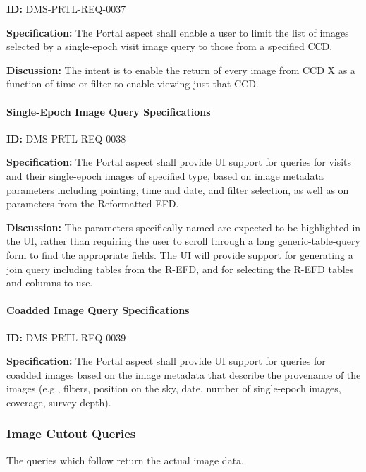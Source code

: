 \documentclass[SE,toc]{lsstdoc}
\begin{document}
\label{DMS-PRTL-REQ-0037}
\textbf{ID:} DMS-PRTL-REQ-0037

\textbf{Specification:}
The Portal aspect shall enable a user to limit the list of images selected by a single-epoch visit image query to those from a specified CCD.

\textbf{Discussion:}
The intent is to enable the return of every image from CCD X as a function of time or filter to enable viewing just that CCD.

\paragraph{Single-Epoch Image Query Specifications}\hfill  %

\label{DMS-PRTL-REQ-0038}
\textbf{ID:} DMS-PRTL-REQ-0038

\textbf{Specification:}
The Portal aspect shall provide UI support for queries for visits and their single-epoch images of specified type, based on image metadata parameters including pointing, time and date, and filter selection, as well as on parameters from the Reformatted EFD.

\textbf{Discussion:}
The parameters specifically named are expected to be highlighted in the UI, rather than requiring the user to scroll through a long generic-table-query form to find the appropriate fields.  The UI will provide support for generating a join query including tables from the R-EFD, and for selecting the R-EFD tables and columns to use.

\paragraph{Coadded Image Query Specifications}\hfill  %

\label{DMS-PRTL-REQ-0039}
\textbf{ID:} DMS-PRTL-REQ-0039

\textbf{Specification:}
The Portal aspect shall provide UI support for queries for coadded images based on the image metadata that describe the provenance of the images (e.g., filters, position on the sky, date, number of single-epoch images, coverage, survey depth).

\subsubsection{Image Cutout Queries}

The queries which follow return the actual image data.
\end{document}
